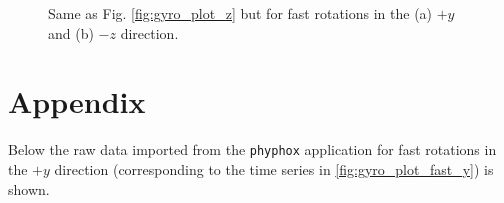 \documentclass[a4paper]{article}
\begin{document}
\begin{figure}[hbt!]
	\centering
	\quad

	\caption{Same as Fig. \ref{fig:gyro_plot_z} but for fast rotations in the (a) $+y$ and (b) $-z$ direction.}
	\label{fig:gyro_plot_fast}
\end{figure}


\newpage
\section{Appendix}

Below the raw data imported from the \texttt{phyphox} application for fast rotations in the $+y$ direction (corresponding to the time series in \ref{fig:gyro_plot_fast_y}) 
is shown.

\setlength\LTleft{0pt}
\setlength\LTright{0pt}
\end{document}
